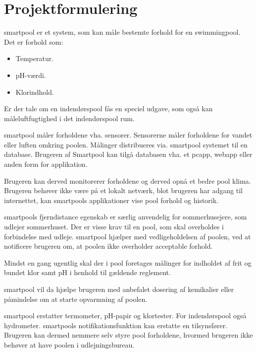 \section{Projektformulering}

\gls{smartpool} er et system, som kan måle bestemte forhold for en swimmingpool. 
Det er forhold som:

\begin{itemize}
	\item Temperatur.
	\item pH-værdi.
	\item Klorindhold.
\end{itemize}

Er der tale om en indendørspool fås en speciel udgave, som også kan måleluftfugtighed i det indendørspool rum.

\gls{smartpool} måler forholdene vha. sensorer. Sensorerne måler forholdene for vandet eller luften omkring poolen. Målinger distribueres via. \gls{smartpool} systemet til en database. Brugeren af Smartpool kan tilgå databasen vha. et \gls{pcapp}, \gls{webapp} eller anden form for applikation. 

Brugeren kan derved monitorerer forholdene og derved opnå et bedre pool klima. Brugeren behøver ikke være på et lokalt netværk, blot brugeren har adgang til internettet, kan \glspl{smartpool} applikationer vise pool forhold og historik. 

\glspl{smartpool} fjerndistance egenskab er særlig anvendelig for sommerhusejere, som udlejer sommerhuset. Der er visse krav til en pool, som skal overholdes i forbindelse med udleje. \gls{smartpool} hjælper med vedligeholdelsen af poolen, ved at notificere brugeren om, at poolen ikke overholder acceptable forhold. 

Mindst en gang ugentlig skal der i pool foretages målinger for indholdet af frit og bundet klor samt pH i henhold til gældende reglement.

\gls{smartpool} vil da hjælpe brugeren med anbefalet dosering af kemikalier eller påmindelse om at starte opvarmning af poolen.

\gls{smartpool} erstatter termometer, pH-papir og klortester. For indendørspool også hydrometer. \glspl{smartpool} notifikationsfunktion kan erstatte en tilsynsfører. Brugeren kan dermed nemmere selv styre pool forholdene, hvormed brugeren ikke behøver at have poolen i udlejningsbureau.
